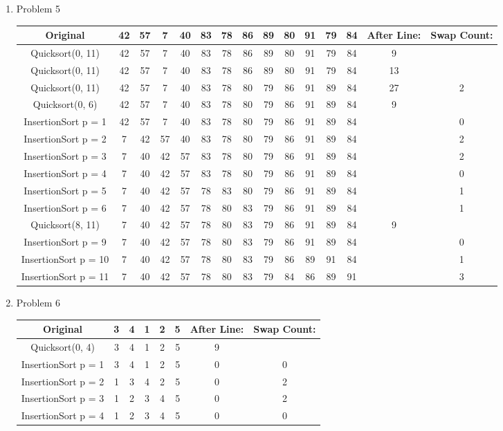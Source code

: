 \documentclass[11pt]{article}
\begin{document}
\begin{enumerate}
\item Problem 5
\begin{center}
\begin{tabular}{c|cccccccccccc|cc}
Original & 42& 57& 7& 40& 83& 78& 86& 89& 80& 91& 79& 84 & After Line:& Swap Count:\\\hline
Quicksort(0, 11)&42& 57& 7& 40& 83& 78& 86& 89& 80& 91& 79& 84&9\\
Quicksort(0, 11)&42& 57& 7& 40& 83& 78& 86& 89& 80& 91& 79& 84&13\\
Quicksort(0, 11)&42& 57& 7& 40& 83& 78& 80& 79& 86& 91& 89& 84&27&2\\
Quicksort(0, 6)&42& 57& 7& 40& 83& 78& 80& 79& 86& 91& 89& 84&9\\
InsertionSort p = 1 &42& 57& 7& 40& 83& 78& 80& 79& 86& 91& 89& 84&&0\\
InsertionSort p = 2 &7& 42& 57& 40& 83& 78& 80& 79& 86& 91& 89& 84&&2\\
InsertionSort p = 3 &7& 40& 42& 57& 83& 78& 80& 79& 86& 91& 89& 84&&2\\
InsertionSort p = 4 &7& 40& 42& 57& 83& 78& 80& 79& 86& 91& 89& 84&&0\\
InsertionSort p = 5 &7& 40& 42& 57& 78& 83& 80& 79& 86& 91& 89& 84&&1\\
InsertionSort p = 6 &7& 40& 42& 57& 78& 80& 83& 79& 86& 91& 89& 84&&1\\
Quicksort(8, 11)&7& 40& 42& 57& 78& 80& 83& 79& 86& 91& 89& 84&9\\
InsertionSort p = 9 &7& 40& 42& 57& 78& 80& 83& 79& 86& 91& 89& 84&&0\\
InsertionSort p = 10 &7& 40& 42& 57& 78& 80& 83& 79& 86& 89& 91& 84&&1\\
InsertionSort p = 11 &7& 40& 42& 57& 78& 80& 83& 79& 84& 86& 89& 91&&3

\end{tabular}
\end{center}

\item Problem 6
\begin{center}
\begin{tabular}{c|ccccc|cc}
Original &3& 4& 1& 2& 5& After Line:& Swap Count:\\\hline
Quicksort(0, 4)&3& 4& 1& 2& 5&9\\
InsertionSort p = 1 &3& 4& 1& 2& 5& 0&0\\
InsertionSort p = 2 &1& 3& 4& 2& 5& 0&2\\
InsertionSort p = 3 &1& 2& 3& 4& 5& 0&2\\
InsertionSort p = 4 &1& 2& 3& 4& 5& 0&0
\end{tabular}
\end{center}
\end{enumerate}
\end{document}
